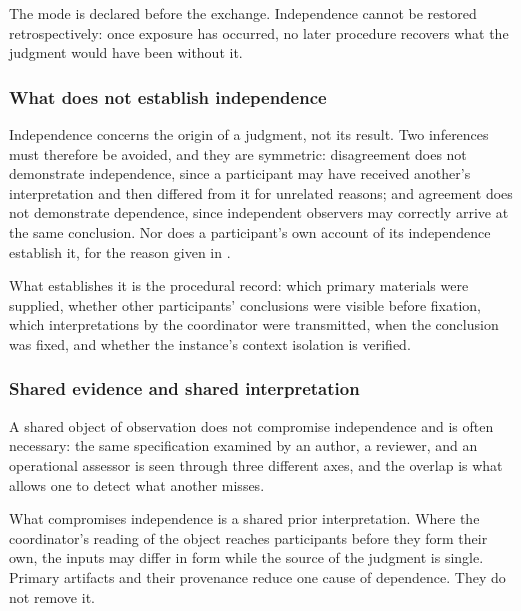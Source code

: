 The mode is declared before the exchange. Independence cannot be restored retrospectively: once exposure has occurred, no later procedure recovers what the judgment would have been without it.


\subsubsection*{What does not establish independence}
\label{sec:en:x-what-does-not-establish-independence}

Independence concerns the origin of a judgment, not its result. Two inferences must therefore be avoided, and they are symmetric: disagreement does not demonstrate independence, since a participant may have received another's interpretation and then differed from it for unrelated reasons; and agreement does not demonstrate dependence, since independent observers may correctly arrive at the same conclusion. Nor does a participant's own account of its independence establish it, for the reason given in .

What establishes it is the procedural record: which primary materials were supplied, whether other participants' conclusions were visible before fixation, which interpretations by the coordinator were transmitted, when the conclusion was fixed, and whether the instance's context isolation is verified.


\subsubsection*{Shared evidence and shared interpretation}
\label{sec:en:x-shared-evidence-and-shared-interpretatio}

A shared object of observation does not compromise independence and is often necessary: the same specification examined by an author, a reviewer, and an operational assessor is seen through three different axes, and the overlap is what allows one to detect what another misses.

What compromises independence is a shared prior interpretation. Where the coordinator's reading of the object reaches participants before they form their own, the inputs may differ in form while the source of the judgment is single. Primary artifacts and their provenance reduce one cause of dependence. They do not remove it.


